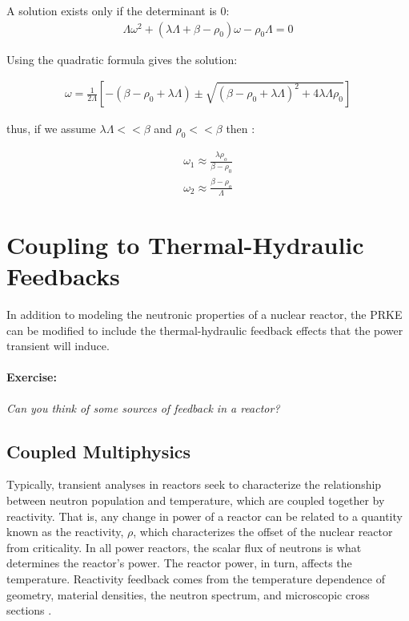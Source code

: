\documentclass[12pt]{article}
\begin{document}
A solution exists only if the determinant is 0:
\begin{align}
\Lambda\omega^2 + \left(\lambda\Lambda + \beta - \rho_0\right)\omega - \rho_0\Lambda = 0
\end{align}

Using the quadratic formula gives the solution:

\begin{align}
\omega = \frac{1}{2 \Lambda}\left[ -\left( \beta - \rho_0 +\lambda\Lambda 
\right) \pm \sqrt{(\beta-\rho_0+\lambda\Lambda)^2 +4\lambda\Lambda\rho_0} \right]
\end{align}

thus, if we assume $\lambda\Lambda << \beta$ and $\rho_0 << \beta$ then :

\begin{align}
\omega_1 \approx \frac{\lambda \rho_o}{\beta-\rho_0}\\
\omega_2 \approx \frac{\beta - \rho_o}{\Lambda}
\end{align}

\section{Coupling to Thermal-Hydraulic Feedbacks}

In addition to modeling
the neutronic properties of a nuclear reactor, the PRKE can be modified to
include the thermal-hydraulic feedback effects that the power transient will
induce.

\paragraph{Exercise:} \emph{Can you think of some sources of feedback in a 
reactor?}

\subsection{Coupled Multiphysics}

Typically, transient analyses in reactors seek to characterize the relationship
between neutron population and temperature, which are coupled together by
reactivity.  That is, any change in power of a reactor can be related to a
quantity known as the reactivity, $\rho$, which characterizes the offset of the
nuclear reactor from criticality. In all power reactors,  the scalar flux of
neutrons is what determines the reactor's power. The reactor power, in turn,
affects the temperature. Reactivity feedback comes from the temperature
dependence of geometry, material densities, the neutron spectrum, and
microscopic cross sections \cite{bell_nuclear_1970}.
\end{document}
